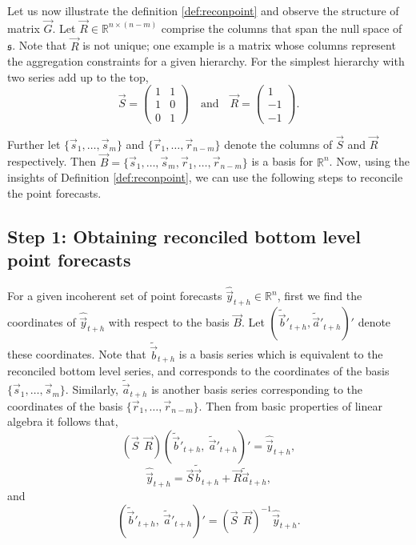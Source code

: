 \documentclass[graybox]{svmult}
\begin{document}
Let us now illustrate the definition \ref{def:reconpoint} and observe the structure of matrix $\vec{G}$. Let $\vec{R} \in \mathbb{R}^{n \times (n-m)}$ comprise the columns that span the null space of $\mathfrak{s}$. Note that $\vec{R}$ is not unique; one example is a matrix whose columns represent the aggregation constraints for a given hierarchy. For the simplest hierarchy with two series add up to the top, 
$$ 
\vec{S} = 
\begin{pmatrix} 
1& 1 \\ 1 & 0 \\ 0&1 
\end{pmatrix} 
\quad \text{and} \quad 
\vec{R} = 
\begin{pmatrix}  
1 \\ -1 \\ -1 
\end{pmatrix}.
$$ 

Further let $\{\vec{s}_1,\dots,\vec{s}_m\}$ and $\{\vec{r}_1,\dots,\vec{r}_{n-m}\}$ denote the columns of $\vec{S}$ and $\vec{R}$ respectively. Then $\vec{B}=\{\vec{s}_1,\dots,\vec{s}_m, \vec{r}_1,\dots,\vec{r}_{n-m}\}$ is a basis for $\mathbb{R}^n$. Now, using the insights of Definition \ref{def:reconpoint}, we can use the following steps to reconcile the point forecasts.

\subsection*{Step 1: Obtaining reconciled bottom level point forecasts}

For a given incoherent set of point forecasts $\hat{\vec{y}}_{t+h} \in \mathbb{R}^n$, first we find the coordinates of $\hat{\vec{y}}_{t+h}$ with respect to the basis $\vec{B}$. Let $(\tilde{\vec{b}}'_{t+h} , \tilde{\vec{a}}'_{t+h})'$ denote these coordinates. Note that $\tilde{\vec{b}}_{t+h}$ is a basis series which is equivalent to the reconciled bottom level series, and corresponds to the coordinates of the basis $\{\vec{s}_1,\dots,\vec{s}_m\}$. Similarly, $\tilde{\vec{a}}_{t+h}$ is another basis series corresponding to the coordinates of the basis $\{\vec{r}_1,\dots,\vec{r}_{n-m}\}$. Then from basic properties of linear algebra it follows that, 
\[
(\vec{S} ~ ~\vec{R})
(\tilde{\vec{b}}'_{t+h},~ \tilde{\vec{a}}'_{t+h})'
= \hat{\vec{y}}_{t+h},
\]
\begin{equation}\label{eq:14}
\hat{\vec{y}}_{t+h} = \vec{S}\tilde{\vec{b}}_{t+h} +  \vec{R}\tilde{\vec{a}}_{t+h},
\end{equation}
and
\begin{equation}\label{eq:15}
(\tilde{\vec{b}}'_{t+h}, ~ \tilde{\vec{a}}'_{t+h})' =
(\vec{S} ~ ~ \vec{R})^{-1}
\hat{\vec{y}}_{t+h}.
\end{equation}
\end{document}
